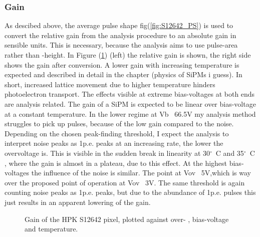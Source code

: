 \documentclass[article,type=msc,colorback,accentcolor=tud9c]{tudthesis}
\begin{document}
\newpage
\subsubsection{Gain}
As descibed above, the average pulse shape fig(\ref{fig:S12642_PS}) is used to convert the relative gain from the analysis procedure to an absolute gain in sensible units. This is necessary, because the analysis aims to use pulse-area rather than -height. In Figure (\ref{fig:S12642_Gain}) (left) the relative gain is shown, the right side shows the gain after conversion.
A lower gain with increasing temperature is expected and described in detail in the chapter (physics of SiPMs i guess). In short, increased lattice movement due to higher temperature hinders photoelectron transport. The effects visible at extreme bias-voltages at both ends are analysis related. The gain of a SiPM is expected to be linear over bias-voltage at a constant temperature. In the lower regime at Vb ~66.5V my analysis method struggles to pick up pulses, because of the low gain compared to the noise. Depending on the chosen peak-finding threshold, I expect the analysis to interpret noise peaks as 1p.e. peaks at an increasing rate, the lower the overvoltage is. This is visible in the sudden break in linearity at 30$^{\circ}$~C and 35$^{\circ}$~C , where the gain is almost in a plateau, due to this effect. At the highest bias-voltages the influence of the noise is similar. The point at Vov ~5V,which is way over the proposed point of operation at Vov ~3V. The same threshold is again counting noise peaks as 1p.e. peaks, but due to the abundance of 1p.e. pulses this just results in an apparent lowering of the gain. 
\begin{figure}[h]
\begin{centering}
\caption{Gain of the HPK S12642 pixel, plotted against over- , bias-voltage and temperature. }
\label{fig:S12642_Gain}
\end{centering}
\end{figure}
\end{document}
